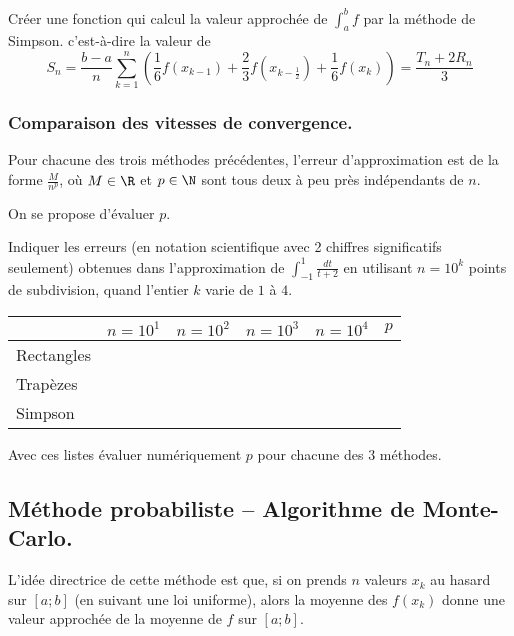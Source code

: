 \documentclass[french,11pt,twoside]{VcCours}
\begin{document}
\begin{Exercice}{}
Créer une fonction  qui calcul la valeur
approchée de $\int_a^b f$ par la méthode de Simpson. c'est-à-dire la
valeur de
\[S_n=\frac{b-a}{n}\sum_{k=1}^{n}\left(\frac16f(x_{k-1})+\frac23f(x_{k-\frac12})+\frac16f(x_{k})\right)=\frac{T_n+2R_n}{3}\]
\end{Exercice}

\subsubsection{Comparaison des vitesses de convergence.}
Pour chacune des trois méthodes précédentes, l'erreur
d'approximation est de la forme $\frac{M}{n^p}$, où $M\in\R$ et
$p\in\N$ sont tous deux à peu près indépendants de $n$.

On se propose d'évaluer $p$.

\begin{Exercice}{}
Indiquer les erreurs (en notation scientifique avec 2 chiffres
significatifs seulement) obtenues dans l'approximation de
$\int_{-1}^1\frac{dt}{t+2}$ en utilisant $n = 10^k$ points de
subdivision, quand l'entier $k$ varie de $1$ à $4$.

\begin{center}
\begin{tabular}{|l|c|c|c|c||c|}
  \hline
  & $n=10^1$ & $n=10^2$ & $n=10^3$ & $n=10^4$ & $p$ \\
  \hline
  Rectangles & \hspace{2cm} & \hspace{2cm} & \hspace{2cm} & \hspace{2cm} & \hspace{1cm} \\
  \hline
  Trapèzes   &  &  &  &  &  \\
  \hline
  Simpson    &  &  &  &  &  \\
  \hline
\end{tabular}
\end{center}

Avec ces listes évaluer numériquement $p$ pour chacune des $3$
méthodes.
\end{Exercice}

\subsection{Méthode probabiliste -- Algorithme de Monte-Carlo.}
L'idée directrice de cette méthode est que, si on prends $n$ valeurs
$x_k$ au hasard sur $[a;b]$ (en suivant une loi uniforme), alors la
moyenne des $f(x_k)$ donne une valeur approchée de la moyenne de $f$
sur $[a;b]$.
\end{document}
